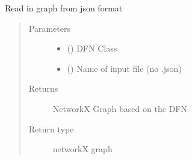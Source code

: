 \documentclass[letterpaper,10pt,english]{sphinxmanual}
\begin{document}

\begin{fulllineitems}
\label{\detokenize{pydfnworks:pydfnworks.dfnGraph.dfn2graph.load_json_graph}}
Read in graph from json format
\begin{quote}\begin{description}
\item[{Parameters}] \leavevmode\begin{itemize}
\item {} 
 () \textendash{} DFN Class

\item {} 
 () \textendash{} Name of input file (no .json)

\end{itemize}

\item[{Returns}] \leavevmode
{} \textendash{} NetworkX Graph based on the DFN

\item[{Return type}] \leavevmode
networkX graph

\end{description}\end{quote}

\end{fulllineitems}

\end{document}
